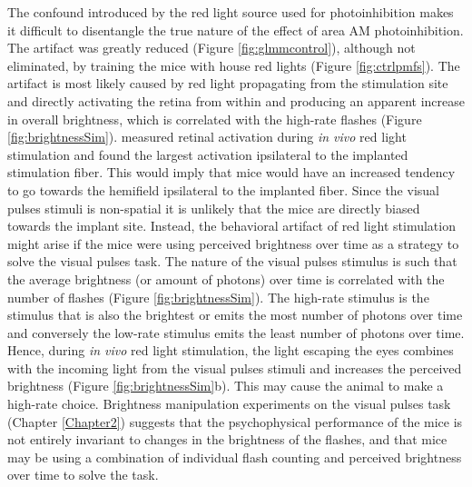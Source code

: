 The confound introduced by the red light source used for photoinhibition makes it difficult to disentangle the true nature of the effect of area AM photoinhibition. The artifact was greatly reduced (Figure \ref{fig:glmmcontrol}), although not eliminated, by training the mice with house red lights (Figure \ref{fig:ctrlpmfs}). The artifact is most likely caused by red light propagating from the stimulation site and directly activating the retina from within \parencite{Danskin2015} and producing an apparent increase in overall brightness, which is correlated with the high-rate flashes (Figure \ref{fig:brightnessSim}). \textcite{Danskin2015} measured retinal activation during \emph{in vivo} red light stimulation and found the largest activation ipsilateral to the implanted stimulation fiber. This would imply that mice would have an increased tendency to go towards the hemifield ipsilateral to the implanted fiber. Since the visual pulses stimuli is non-spatial it is unlikely that the mice are directly biased towards the implant site. Instead, the behavioral artifact of red light stimulation might arise if the mice were using perceived brightness over time as a strategy to solve the visual pulses task. The nature of the visual pulses stimulus is such that the average brightness (or amount of photons) over time is correlated with the number of flashes (Figure \ref{fig:brightnessSim}). The high-rate stimulus is the stimulus that is also the brightest or emits the most number of photons over time and conversely the low-rate stimulus emits the least number of photons over time. Hence, during \emph{in vivo} red light stimulation, the light escaping the eyes combines with the incoming light from the visual pulses stimuli and increases the perceived brightness (Figure \ref{fig:brightnessSim}b). This may cause the animal to make a high-rate choice. Brightness manipulation experiments on the visual pulses task (Chapter \ref{Chapter2}) suggests that the psychophysical performance of the mice is not entirely invariant to changes in the brightness of the flashes, and that mice may be using a combination of individual flash counting and perceived brightness over time to solve the task.\par 
